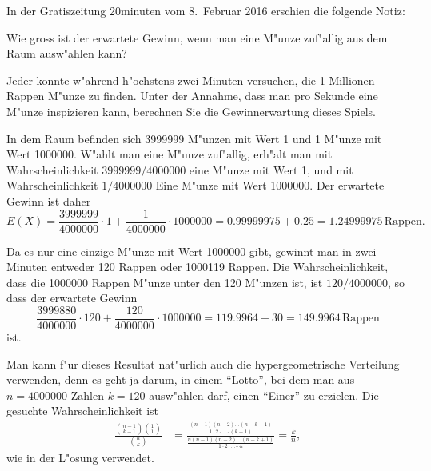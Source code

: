 In der Gratiszeitung 20minuten vom 8.~Februar 2016 erschien die folgende
Notiz:
\begin{center}
\end{center}
\begin{teilaufgaben}
\item Wie gross ist der erwartete Gewinn, wenn man eine M"unze zuf"allig
aus dem Raum ausw"ahlen kann?
\item
Jeder konnte w"ahrend h"ochstens zwei Minuten versuchen, die 1-Millionen-Rappen
M"unze zu finden. 
Unter der Annahme, dass man pro Sekunde eine M"unze inspizieren kann, 
berechnen Sie die Gewinnerwartung dieses Spiels.
\end{teilaufgaben}

\begin{loesung}
\begin{teilaufgaben}
\item
In dem Raum befinden sich 3999999 M"unzen mit Wert 1 und 1 M"unze mit
Wert 1000000.
W"ahlt man eine M"unze zuf"allig, erh"alt man mit Wahrscheinlichkeit
$3999999/4000000$ eine M"unze mit Wert 1, und mit Wahrscheinlichkeit
$1/4000000$ Eine M"unze mit Wert 1000000.
Der erwartete Gewinn ist daher
\[
E(X) = \frac{3999999}{4000000}\cdot 1 + \frac{1}{4000000}\cdot 1000000
=0.99999975 + 0.25 = 1.24999975\,\text{Rappen}.
\]
\item
Da es nur eine einzige M"unze mit Wert 1000000 gibt, gewinnt man
in zwei Minuten entweder 120 Rappen oder 1000119 Rappen.
Die Wahrscheinlichkeit, dass die 1000000 Rappen M"unze unter den
120 M"unzen ist, ist $120/4000000$, so dass der erwartete Gewinn
\[
\frac{3999880}{4000000}\cdot 120
+
\frac{120}{4000000}\cdot 1000000
=
119.9964 + 30=149.9964\,\text{Rappen}
\]
ist.
\qedhere
\end{teilaufgaben}
\end{loesung}

\begin{diskussion}
Man kann f"ur dieses Resultat nat"urlich auch die hypergeometrische
Verteilung verwenden, denn es geht ja darum, in einem ``Lotto'', bei dem
man aus $n=4000000$ Zahlen $k=120$ ausw"ahlen darf, einen ``Einer''
zu erzielen.
Die gesuchte Wahrscheinlichkeit ist
\begin{align*}
\frac{\displaystyle\binom{n-1}{k-1}\binom{1}{1}}{\displaystyle\binom{n}{k}}
&=
\frac{\displaystyle\frac{(n-1)(n-2)\dots(n-k+1)}{1\cdot 2\cdot\dots\cdot (k-1)}}%
{\displaystyle\frac{n(n-1)(n-2)\dots(n-k+1)}{1\cdot 2\cdot\dots\cdots k}}
=\frac{k}{n},
\end{align*}
wie in der L"osung verwendet.
\end{diskussion}

